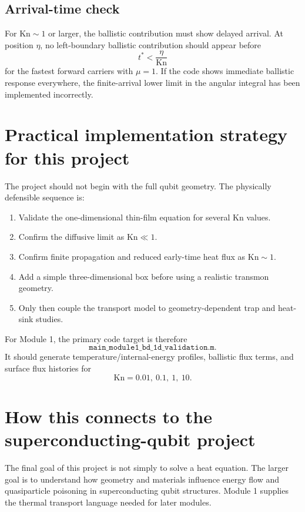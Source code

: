 \documentclass[11pt]{article}
\begin{document}
\subsection{Arrival-time check}
For \(\mathrm{Kn}\sim1\) or larger, the ballistic contribution must show delayed arrival. At position \(\eta\), no left-boundary ballistic contribution should appear before
\begin{equation}
    t^*<\frac{\eta}{\mathrm{Kn}}
\end{equation}
for the fastest forward carriers with \(\mu=1\). If the code shows immediate ballistic response everywhere, the finite-arrival lower limit in the angular integral has been implemented incorrectly.

\section{Practical implementation strategy for this project}
The project should not begin with the full qubit geometry. The physically defensible sequence is:
\begin{enumerate}[leftmargin=1.6em]
    \item Validate the one-dimensional thin-film equation for several \(\mathrm{Kn}\) values.
    \item Confirm the diffusive limit as \(\mathrm{Kn}\ll1\).
    \item Confirm finite propagation and reduced early-time heat flux as \(\mathrm{Kn}\sim1\).
    \item Add a simple three-dimensional box before using a realistic transmon geometry.
    \item Only then couple the transport model to geometry-dependent trap and heat-sink studies.
\end{enumerate}

For Module 1, the primary code target is therefore
\begin{equation}
    \texttt{main\_module1\_bd\_1d\_validation.m}.
\end{equation}
It should generate temperature/internal-energy profiles, ballistic flux terms, and surface flux histories for
\begin{equation}
    \mathrm{Kn}=0.01,\ 0.1,\ 1,\ 10.
\end{equation}

\section{How this connects to the superconducting-qubit project}
The final goal of this project is not simply to solve a heat equation. The larger goal is to understand how geometry and materials influence energy flow and quasiparticle poisoning in superconducting qubit structures. Module 1 supplies the thermal transport language needed for later modules.
\end{document}
